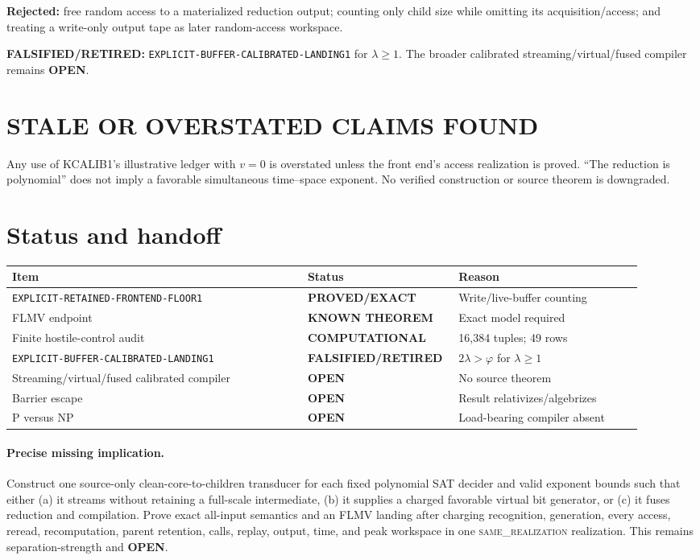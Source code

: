 \documentclass[11pt]{article}
\newcommand{\EXACT}{\textbf{PROVED/EXACT}}
\newcommand{\KNOWN}{\textbf{KNOWN THEOREM}}
\newcommand{\COMP}{\textbf{COMPUTATIONAL}}
\newcommand{\OPEN}{\textbf{OPEN}}
\newcommand{\RETIRED}{\textbf{FALSIFIED/RETIRED}}
\newcommand{\same}{\textsc{same\_realization}}
\begin{document}
\textbf{Rejected:} free random access to a materialized reduction output;
counting only child size while omitting its acquisition/access; and treating a
write-only output tape as later random-access workspace.

\textbf{FALSIFIED/RETIRED:}
\texttt{EXPLICIT-BUFFER-CALIBRATED-LANDING1} for $\lambda\ge1$.  The broader
calibrated streaming/virtual/fused compiler remains \OPEN.

\section{STALE OR OVERSTATED CLAIMS FOUND}
Any use of KCALIB1's illustrative ledger with $v=0$ is overstated unless the
front end's access realization is proved.  ``The reduction is polynomial''
does not imply a favorable simultaneous time--space exponent.  No verified
construction or source theorem is downgraded.

\section{Status and handoff}
\begin{center}\small
\begin{tabular}{p{0.45\linewidth}p{0.18\linewidth}p{0.28\linewidth}}
\toprule Item & Status & Reason\\ \midrule
\texttt{EXPLICIT-RETAINED-FRONTEND-FLOOR1} & \EXACT & Write/live-buffer counting\\
FLMV endpoint & \KNOWN & Exact model required\\
Finite hostile-control audit & \COMP & 16,384 tuples; 49 rows\\
\texttt{EXPLICIT-BUFFER-CALIBRATED-LANDING1} & \RETIRED & $2\lambda>\varphi$ for $\lambda\ge1$\\
Streaming/virtual/fused calibrated compiler & \OPEN & No source theorem\\
Barrier escape & \OPEN & Result relativizes/algebrizes\\
P versus NP & \OPEN & Load-bearing compiler absent\\
\bottomrule
\end{tabular}
\end{center}

\paragraph{Precise missing implication.}
Construct one source-only clean-core-to-children transducer for each fixed
polynomial SAT decider and valid exponent bounds such that either (a) it
streams without retaining a full-scale intermediate, (b) it supplies a
charged favorable virtual bit generator, or (c) it fuses reduction and
compilation.  Prove exact all-input semantics and an FLMV landing after
charging recognition, generation, every access, reread, recomputation,
parent retention, calls, replay, output, time, and peak workspace in one
\same{} realization.  This remains separation-strength and \OPEN.
\end{document}

